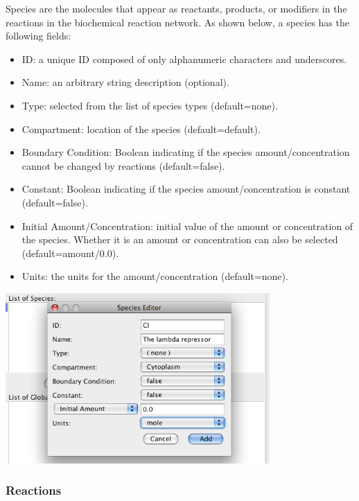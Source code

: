 \documentclass[titlepage,11pt]{article}
\begin{document}
\noindent
Species are the molecules that appear as reactants, products, or modifiers
in the reactions in the biochemical reaction network. 
As shown below, a species has the following fields:
\begin{itemize}
\item ID: a unique ID composed of only alphanumeric characters and 
       underscores.
\item Name: an arbitrary string description (optional).
\item Type: selected from the list of species types (default=none).
\item Compartment: location of the species (default=default).
\item Boundary Condition: Boolean indicating if the species 
       amount/concentration
       cannot be changed by reactions (default=false).
\item Constant: Boolean indicating if the species amount/concentration 
       is constant (default=false).
\item Initial Amount/Concentration: initial value of the amount or 
       concentration of the species. Whether it is an amount or concentration
       can also be selected (default=amount/0.0).
\item Units: the units for the amount/concentration (default=none).
\end{itemize}
\begin{center}
\includegraphics[height=65mm]{screenshots/species}
\end{center}

\subsubsection{\label{reactions}Reactions}
\end{document}
